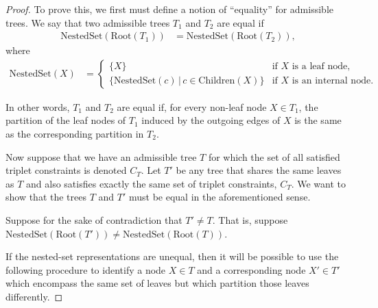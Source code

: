 \documentclass{article}
\theoremstyle{definition}
\begin{document}
\newcommand{\NestedSet}{\mathrm{NestedSet}}
\newcommand{\Root}{\mathrm{Root}}
\newcommand{\Children}{\mathrm{Children}}

\begin{proof}
To prove this, we first must define a notion of ``equality'' for admissible trees.
We say that two admissible trees $T_1$ and $T_2$ are equal if
\begin{align*}
\NestedSet(\Root(T_1)) &= \NestedSet(\Root(T_2)),
\end{align*}
where
\begin{align*}
\NestedSet(X)
&=
\begin{cases}
\{ X \} & \text{if $X$ is a leaf node}, \\
\{ \NestedSet(c) \, | \, c \in \Children(X) \} & \text{if $X$ is an internal node.}
\end{cases}
\end{align*}

In other words, $T_1$ and $T_2$ are equal if, for every non-leaf node $X \in T_1$, the partition of the leaf nodes of $T_1$ induced by the outgoing edges of $X$ is the same as the corresponding partition in $T_2$.

Now suppose that we have an admissible tree $T$ for which the set of all satisfied triplet constraints is denoted $C_T$.
Let $T'$ be any tree that shares the same leaves as $T$ and also satisfies exactly the same set of triplet constraints, $C_T$.
We want to show that the trees $T$ and $T'$ must be equal in the aforementioned sense.

Suppose for the sake of contradiction that $T' \neq T$.
That is, suppose $\NestedSet(\Root(T')) \neq \NestedSet(\Root(T))$.

If the nested-set representations are unequal, then it will be possible to use the following procedure to identify a node $X \in T$ and a corresponding node $X' \in T'$ which encompass the same set of leaves but which partition those leaves differently.


\end{proof}
\end{document}
